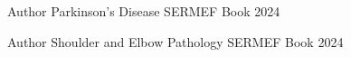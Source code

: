 

\begin{cventries}

  \cventry
    {Author} %
    {Parkinson's Disease} %
    {SERMEF Book} %
    {2024} %
    {}

  \cventry
    {Author} %
    {Shoulder and Elbow Pathology} %
    {SERMEF Book} %
    {2024} %
    {}

\end{cventries}

